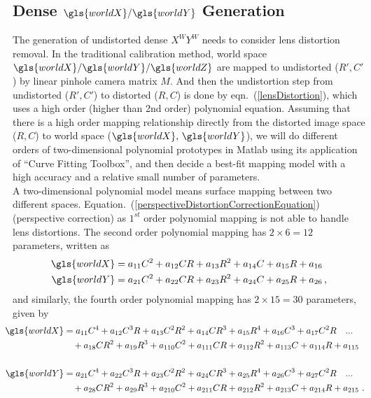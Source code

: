 \subsection{Dense \(\gls{worldX}/\gls{worldY}\) Generation}
\indent
The generation of undistorted dense \(X^WY^W\) needs to consider lens distortion removal. In the traditional calibration method, world space \(\gls{worldX}/\gls{worldY}/\gls{worldZ}\) are mapped to undistorted (\(R', C'\)) by linear pinhole camera matrix \(M\). And then the undistortion step from undistorted (\(R', C'\)) to distorted (\(R, C\)) is done by eqn.~(\ref{lensDistortion}), which uses a high order (higher than 2nd order) polynomial equation. Assuming that there is a high order mapping relationship directly from the distorted image space (\(R, C\)) to world space (\(\gls{worldX}, \, \gls{worldY}\)), we will do different orders of two-dimensional polynomial prototypes in Matlab using its application of \enquote{Curve Fitting Toolbox}, and then decide a best-fit mapping model with a high accuracy and a relative small number of parameters.
%
\\\indent
A two-dimensional polynomial model means surface mapping between two different spaces. Equation.~(\ref{perspectiveDistortionCorrectionEquation}) (perspective correction) as \(1^{st}\) order polynomial mapping is not able to handle lens distortions. 
%
The second order polynomial mapping has $2\times6=12$ parameters, written as %
%
\begin{equation}
\begin{aligned}
\gls{worldX} &=  a_{11}C^2 + a_{12}CR + a_{13}R^2 + a_{14}C + a_{15}R + a_{16}
\\%
\gls{worldY} &=  a_{21}C^2 + a_{22}CR + a_{23}R^2 + a_{24}C + a_{25}R + a_{26} \, , 
\end{aligned}
\label{secondOrderPolynomial}
\end{equation}%
%
\noindent
and similarly, the fourth order polynomial mapping has $2\times15=30$ parameters, given by 
%
\begin{equation}
\hspace*{-0.3cm}%
\begin{aligned}
\gls{worldX} &=  a_{11}C^4 + a_{12}C^3R + a_{13}C^2R^2 + a_{14}CR^3 + a_{15}R^4 + a_{16}C^3 + a_{17}C^2R \ \ \ ...\\%
&\,\,\,\,\,\,+ a_{18}CR^2 + a_{19}R^3 + a_{110}C^2 + a_{111}CR + a_{112}R^2 + a_{113}C + a_{114}R + a_{115}
\\\\%
\gls{worldY} &=  a_{21}C^4 + a_{22}C^3R + a_{23}C^2R^2 + a_{24}CR^3 + a_{25}R^4 + a_{26}C^3 + a_{27}C^2R \ \ \ ...\\%
&\,\,\,\,\,\,+ a_{28}CR^2 + a_{29}R^3 + a_{210}C^2 + a_{211}CR + a_{212}R^2 + a_{213}C + a_{214}R + a_{215}      \,\,.
\end{aligned}
\label{fourthOrderPolynomial}
\end{equation}%
